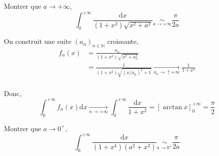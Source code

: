 \begin{Example}{}{}
Montrer que $a \to + \infty$, 
\begin{equation}
  \int_{0}^{+ \infty} \frac{\mathrm{d}x}{(1+x ^{2}) \sqrt{x ^{2}+a ^{2} }}  \underset{a \to +\infty}{\sim}   \frac{\pi}{2a} 
\end{equation}
\end{Example}

\begin{myproof}{}{}
On construit une suite $(a_n) _{n \in \mathbb{N}}$ croissante, 
\begin{align}
  f_n(x) &= \frac{a_n}{(1+x ^{2}) \sqrt{x ^{2} + a_n ^{2}}}  \\ 
         &= \frac{1}{(1+x ^{2}) \sqrt{(x/a_n) ^{2}+1}}   \underset{a_n \to \uparrow + \infty}{\longrightarrow} \frac{1}{1+x ^2} \\ 
\end{align}

Donc, 
\begin{equation}
  \int_{0}^{+ \infty} f_n(x) \mathrm{d}x  \underset{n \to + \infty}{\longrightarrow}  \int_{0}^{+ \infty} \frac{\mathrm{d}x}{1 + x ^{2}}  = \left[ \arctan x \right] _0 ^{+ \infty} = \frac{\pi}{2} 
\end{equation}
\end{myproof}

\begin{Example}{}{}
Montrer que $a \to 0 ^{+}$, 
\begin{equation}
  \int_{0}^{+ \infty} \frac{\mathrm{d}x}{(1+x ^{4})(a ^{2}+ x ^{2})}   \underset{a \to 0 ^{+}}{\sim} \frac{\pi}{2a} 
\end{equation}
\end{Example}


